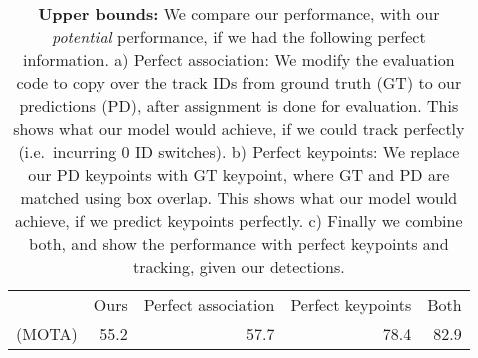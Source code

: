 \documentclass[10pt,twocolumn,letterpaper]{article}
\newcommand{\tableSize}[0]{\small}
\begin{document}
\begin{table}[t]
  \tableSize{}
  \setlength\tabcolsep{1pt} 
  \begin{center}
  \end{center}
  \caption{{\bf Comparison between different similarity cost criteria}.
  We compare various different hand-crafted and learned cost criterion for the matching stage to generate tracks. Interestingly,
  simple hand-crafted approaches perform very well for the task. We choose to go with the simple bounding box overlap due to low
  computational cost and strong performance.
  }\label{tab:cost}
\end{table}


\begin{table}[t]
  \small
  \setlength\tabcolsep{4pt} 
  \begin{center}
    \begin{tabular}{lr|rrr}
      \toprule
      & Ours & Perfect association & Perfect keypoints & Both \\
      (MOTA) & 55.2 & 57.7 & 78.4 & 82.9 \\
      \bottomrule
    \end{tabular}
  \end{center}
  \caption{
  {\bf Upper bounds:} We compare our performance, with our \textit{potential} performance, if we had the following perfect information. a) Perfect association: We modify the evaluation code to copy over the track IDs from ground truth (GT) to our predictions (PD), after assignment is done for evaluation. This shows what our model would achieve, if we could track perfectly (i.e.\ incurring 0 ID switches). b) Perfect keypoints: We replace our PD keypoints with GT keypoint, where GT and PD are matched using box overlap. This shows what our model would achieve, if we  predict keypoints perfectly.
  c) Finally we combine both, and show the performance with perfect keypoints and tracking, given our detections.
  }\label{tab:upper_bound}
\end{table}
\end{document}
